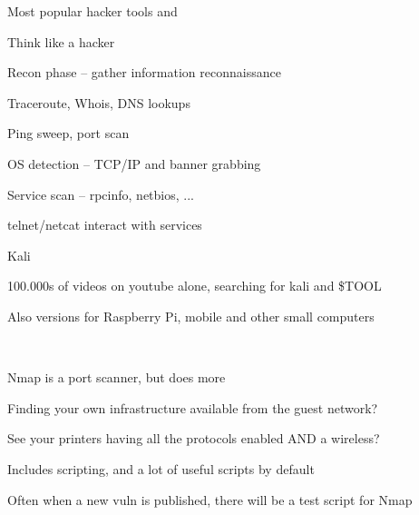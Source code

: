 \documentclass[Screen16to9,17pt]{foils}
\begin{document}
\vskip 5mm
\centerline{Most popular hacker tools  and }



\begin{list1}
\item Think like a hacker
\item Recon phase -- gather information reconnaissance
\begin{list2}
\item Traceroute, Whois, DNS lookups
\item Ping sweep, port scan
\item OS detection -- TCP/IP and banner grabbing
\item Service scan -- rpcinfo, netbios, ...
\item telnet/netcat interact with services
\end{list2}
\end{list1}



\begin{list1}
\item  Kali 
\item 100.000s of videos on youtube alone, searching for kali and \$TOOL
\item Also versions for Raspberry Pi, mobile and other small computers
\end{list1}







{~}

\begin{list2}
\item Nmap is a port scanner, but does more
\item Finding your own infrastructure available from the guest network?
\item See your printers having all the protocols enabled AND a wireless?
\item Includes scripting, and a lot of useful scripts by default
\item Often when a new vuln is published, there will be a test script for Nmap
\end{list2}
\end{document}
